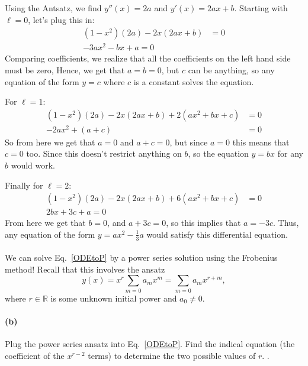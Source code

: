\documentclass{article}
\begin{document}
\begin{solution}
	Using the Antsatz, we find $y''(x) = 2a$ and $y'(x) = 2ax + b$. Starting with $\ell = 0$, let's plug this
	in:
	\begin{align*}
		(1-x^2)(2a) - 2x(2ax + b) &= 0 \\
		-3ax^2 - bx + a = 0
	\end{align*}	
	Comparing coefficients, we realize that all the coefficients on the left hand side must be zero, Hence, 
	we get that $a = b = 0$, but $c$ can be anything, so any equation of the form $y = c$ where $c$ is 
	a constant solves the equation.

	For $\ell = 1$: 
	\begin{align*}
		(1-x^2)(2a) - 2x(2ax + b) + 2(ax^2+ bx + c) &= 0 \\
		-2ax^2 + (a + c) &= 0
	\end{align*}
	So from here we get that $a=0$ and $a+c=0$, but since $a = 0$ this means that $c = 0$ too. Since this 
	doesn't restrict anything on $b$, so the equation $y = bx$ for any $b$ would work. 

	Finally for $\ell = 2$:
	\begin{align*}
		(1-x^2)(2a) - 2x(2ax + b) + 6(ax^2 + bx + c) &= 0 \\
		2bx + 3c + a = 0
	\end{align*}
	From here we get that $b =0$, and $a + 3c = 0$, so this implies that $a=-3c$. Thus, any equation of 
	the form $y = ax^2-\frac{1}{3}a$ would satisfy this differential equation.
\end{solution}

\phline
\paragraph{}
We can solve Eq.~\ref{ODEtoP} by a power series solution using the Frobenius method!  Recall that this involves the ansatz
	\begin{equation*}
		y(x) = x^{r}\sum_{m=0}a_{m}x^{m} = \sum_{m=0}a_{m}x^{r+m},
	\end{equation*}
where $r\in\mathbb{R}$ is some unknown initial power and $a_{0} \neq 0$.

\paragraph{(b)}
Plug the power series ansatz into Eq.~\ref{ODEtoP}.  Find the indical equation (the coefficient of
the $x^{r-2}$ terms) to determine the two possible values of $r$.
.
\end{document}
